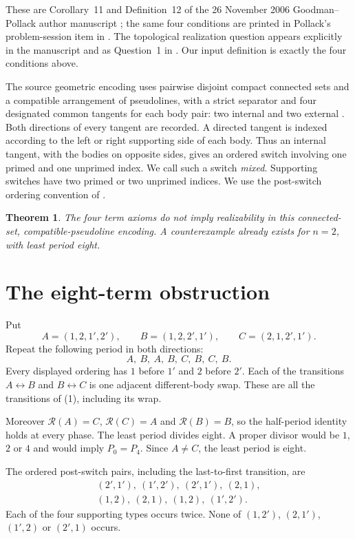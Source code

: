 \documentclass[11pt]{article}
\newtheorem{theorem}{Theorem}
\newcommand{\rev}{\mathcal R}
\begin{document}
These are Corollary~11 and Definition~12 of the 26 November 2006
Goodman--Pollack author manuscript \cite[pp.~8--9]{GP06}; the same four
conditions are printed in Pollack's problem-session item in
\cite[p.~2551]{OWR}. The topological realization question appears explicitly
in the manuscript and as Question~1 in \cite[p.~2492]{OWR}.
Our input definition is exactly the four conditions above.

The source geometric encoding uses pairwise disjoint compact connected
sets and a compatible arrangement of pseudolines, with a strict separator
and four designated common tangents for each body pair: two internal and
two external \cite[Theorem~1 and Definitions~4,~8--9]{GP06}.
Both directions of every tangent are recorded. A directed tangent is
indexed according to the left or right supporting side of each body.
Thus an internal tangent, with the bodies on opposite sides, gives an
ordered switch involving one primed and one unprimed index. We call
such a switch \emph{mixed}. Supporting switches have two primed or two
unprimed indices. We use the post-switch ordering convention of
\cite[p.~7]{GP06}.

\begin{theorem}\label{thm:negative}
The four term axioms do not imply realizability in this connected-set,
compatible-pseudoline encoding. A counterexample already exists for
$n=2$, with least period eight.
\end{theorem}

\section{The eight-term obstruction}

Put
\[
 A=(1,2,1',2'),\qquad B=(1,2,2',1'),\qquad C=(2,1,2',1').
\]
Repeat the following period in both directions:
\[
 \boxed{A,\ B,\ A,\ B,\ C,\ B,\ C,\ B.}                 \tag{1}
\]
Every displayed ordering has $1$ before $1'$ and $2$ before $2'$.
Each of the transitions $A\leftrightarrow B$ and
$B\leftrightarrow C$ is one adjacent different-body swap. These are all
the transitions of (1), including its wrap.

Moreover $\rev(A)=C$, $\rev(C)=A$ and $\rev(B)=B$, so the half-period
identity holds at every phase. The least period divides eight. A proper
divisor would be $1$, $2$ or $4$ and would imply $P_0=P_4$.
Since $A\ne C$, the least period is eight.

The ordered post-switch pairs, including the last-to-first transition,
are
\[
\begin{gathered}
 (2',1'),\ (1',2'),\ (2',1'),\ (2,1),\\
 (1,2),\ (2,1),\ (1,2),\ (1',2').
\end{gathered}                                                   \tag{2}
\]
Each of the four supporting types occurs twice. None of
$(1,2')$, $(2,1')$, $(1',2)$ or $(2',1)$ occurs.
\end{document}
